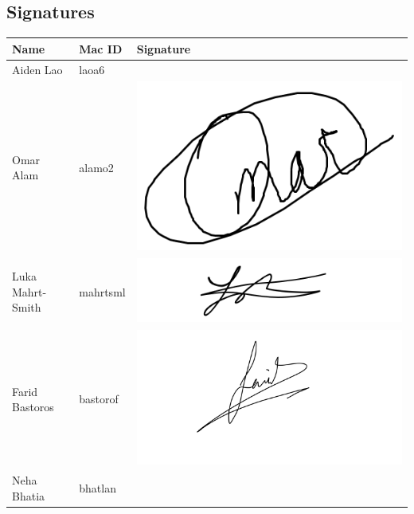 \documentclass[]{article}
\begin{document}
\subsection{Signatures}
\begin{center}
	\renewcommand{\arraystretch}{1.5} %
	\begin{tabular}{|m{4cm}|m{4cm}|m{6cm}|} %
		\hline
		\textbf{Name} & \textbf{Mac ID} & \textbf{Signature} \\
		\hline
		Aiden Lao & laoa6 & \\ 
		\hline
		Omar Alam & alamo2 & \includegraphics[scale=0.3]{omar-signature.png} \\ 
		\hline
		Luka Mahrt-Smith & mahrtsml & \includegraphics[scale=0.1]{luka_signature.png}\\ 
		\hline
		Farid Bastoros & bastorof & \includegraphics[scale=0.06]{Farid Bastoros - Signature.jpeg}\\ 
		\hline
		Neha Bhatia & bhatlan & \\ 
		\hline
	\end{tabular}
\end{center}
\end{document}
